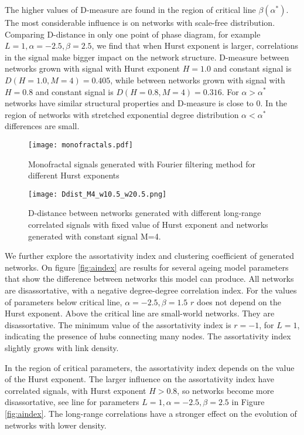 The higher values of D-measure are found in the region of critical line $\beta(\alpha^{*})$. The most considerable influence is on networks with scale-free distribution. Comparing D-distance in only one point of  phase diagram, for example $L=1, \alpha = -2.5, \beta = 2.5$, we find that when Hurst exponent is larger, correlations in the signal make bigger impact on the network structure. D-measure between networks grown with signal with Hurst exponent $H=1.0$ and constant signal is $D(H=1.0, M=4) = 0.405$, while between networks grown with signal with $H=0.8$ and constant signal is $D(H=0.8, M=4) = 0.316$. For $\alpha>\alpha^{*}$ networks have similar structural properties and D-measure is close to 0. In the region of networks with stretched exponential degree distribution $\alpha<\alpha^{*}$  differences are small. 

\begin{figure}[H]
	\centering
	\texttt{[image: monofractals.pdf]}
	\caption[Long range correlated monofractal signals]{Monofractal signals generated with Fourier filtering method for different Hurst exponents}
	\label{fig:monofractals}
\end{figure}

\begin{figure}[H]
	\centering
	\texttt{[image: Ddist\_M4\_w10.5\_w20.5.png]}
	\caption[D-distance for networks generated with monofractal signals. ]{D-distance between networks generated with different long-range correlated signals with fixed value of Hurst exponent and networks generated with constant signal M=4.}
	\label{fig:Ddist_m}
\end{figure}


We further explore the assortativity index and clustering coefficient of generated networks. On figure \ref{fig:aindex} are results for several ageing model parameters that show the difference between networks this model can produce. All networks are disassortative, with a negative degree-degree correlation index. For the values of parameters below critical line, $\alpha=-2.5, \beta=1.5$ $r$ does not depend on the Hurst exponent. Above the critical line are small-world networks. They are disassortative. The minimum value of the assortativity index is $r =-1$, for $L=1$, indicating the presence of hubs connecting many nodes. The assortativity index slightly grows with link density. 

In the region of critical parameters, the assortativity index depends on the value of the Hurst exponent. The larger influence on the assortativity index have correlated signals, with Hurst exponent $H>0.8$, so networks become more disassortative, see line for parameters $L=1, \alpha=-2.5, \beta=2.5$ in Figure \ref{fig:aindex}. The long-range correlations have a stronger effect on the evolution of networks with lower density. 

